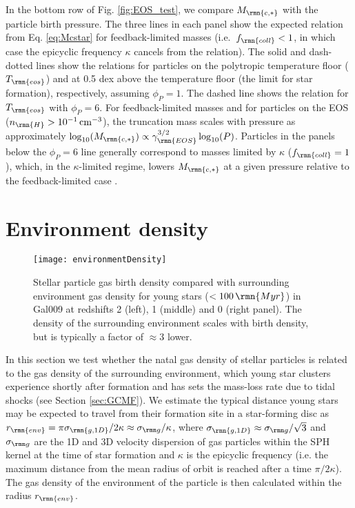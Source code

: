 \documentclass[fleqn,usenatbib]{mnras}
\newcommand\Myr{\,\rmn{Myr}}
\newcommand{\cmcubed}              {\,{\rm cm}^{-3}}
\newcommand{\Mcstar}{M_\rmn{c,\ast}}
\begin{document}
In the bottom row of Fig. \ref{fig:EOS_test}, we compare $\Mcstar$ with the particle birth pressure. The three lines in each panel show the expected relation from Eq. \ref{eq:Mcstar} for feedback-limited masses (i.e.~$f_\rmn{coll} < 1$, in which case the epicyclic frequency $\kappa$ cancels from the relation). The solid and dash-dotted lines show the relations for particles on the polytropic temperature floor ($T_\rmn{eos}$) and at 0.5 dex above the temperature floor (the limit for star formation), respectively, assuming $\phi_P=1$. The dashed line shows the relation for $T_\rmn{eos}$ with $\phi_P = 6$. For feedback-limited masses and for particles on the EOS ($n_\rmn{H}>10^{-1} \cmcubed$), the truncation mass scales with pressure as approximately $\log_{10}(\Mcstar) \propto \gamma_\rmn{EOS}^{3/2} \log_{10}(P)$.
Particles in the panels below the $\phi_P=6$ line generally correspond to masses limited by $\kappa$ ($f_\rmn{coll} = 1$), which, in the $\kappa$-limited regime, lowers $\Mcstar$ at a given pressure relative to the feedback-limited case \citep[recall the method selects the minimum of feedback-limited and $\kappa$-limited masses; e.g. see Fig. 7 in][]{Reina-Campos_and_Kruijssen_17}.



\section{Environment density} \label{app:env_density}

\begin{figure*}
  \texttt{[image: environmentDensity]}
  \caption{ Stellar particle gas birth density compared with surrounding environment gas density for young stars           ($<100\Myr$) in Gal009 at redshifts 2 (left), 1 (middle) and 0 (right panel). The density of the surrounding environment scales with birth density, but is typically a factor of $\approx3$ lower.}
  \label{fig:env_density}
\end{figure*}

In this section we test whether the natal gas density of stellar particles is related to the gas density of the surrounding environment, which young star clusters experience shortly after formation and has sets the mass-loss rate due to tidal shocks (see Section \ref{sec:GCMF}).
We estimate the typical distance young stars may be expected to travel from their formation site in a star-forming disc as $r_\rmn{env} = \pi \sigma_\rmn{g,1D} / 2 \kappa \approx \sigma_{\rmn g} / \kappa$, where $\sigma_\rmn{g,1D} \approx \sigma_{\rmn g} / \sqrt{3}$ and $\sigma_{\rmn g}$ are the 1D and 3D velocity dispersion of gas particles within the SPH kernel at the time of star formation and $\kappa$ is the epicyclic frequency (i.e. the maximum distance from the mean radius of orbit is reached after a time $\pi/2\kappa$). The gas density of the environment of the particle is then calculated within the radius $r_\rmn{env}$.
\end{document}
